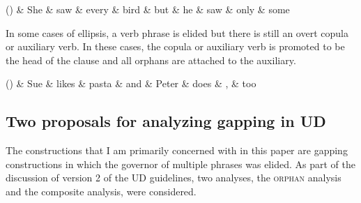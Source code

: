 \documentclass[lucida,biblatex]{sp} %
\newcounter{excounter}
\begin{document}
\begin{center}
  \label{ex:nom-ellipsis}
  \footnotesize
  \begin{dependency}[edge unit distance=2.5ex]
    \begin{deptext}[column sep=0.1cm]
      (\theexcounter) 
      \& She \& saw \& every \& bird \& but \& he \& saw \& only \& some \\
    \end{deptext}
  \end{dependency}
\end{center}

In some cases of ellipsis, a verb phrase is elided but there is still an overt copula or auxiliary 
verb. In these cases, the copula or auxiliary verb is promoted to be the head of the clause 
and all orphans are attached to the auxiliary.

\begin{center}
  \label{ex:vp-ellipsis}
  \footnotesize
  \begin{dependency}[edge unit distance=2.5ex]
    \begin{deptext}[column sep=0.2cm]
      (\theexcounter) 
      \& Sue \& likes \& pasta \& and \& Peter \& does \& , \& too  \\
    \end{deptext}
  \end{dependency}
\end{center}

\subsection{Two proposals for analyzing gapping in UD}

The constructions that I am primarily concerned with in this paper are gapping constructions in which the governor of multiple phrases was elided. As part of the discussion of version 2 of the UD guidelines, two analyses, the \textsc{orphan} analysis and the {\sc composite} analysis, were considered.
\end{document}
